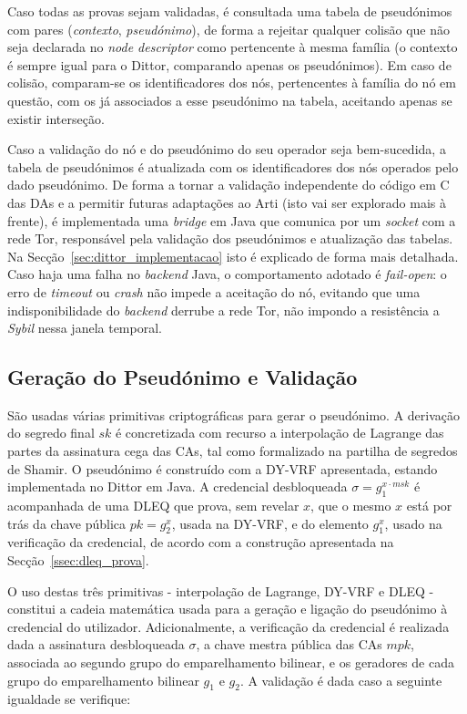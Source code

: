 Caso todas as provas sejam validadas, é consultada uma tabela de pseudónimos com pares (\textit{contexto}, \textit{pseudónimo}), de forma a rejeitar qualquer colisão que não seja declarada no \textit{node descriptor} como pertencente à mesma família (o contexto é sempre igual para o Dittor, comparando apenas os pseudónimos). Em caso de colisão, comparam-se os identificadores dos nós, pertencentes à família do nó em questão, com os já associados a esse pseudónimo na tabela, aceitando apenas se existir interseção.

Caso a validação do nó e do pseudónimo do seu operador seja bem-sucedida, a tabela de pseudónimos é atualizada com os identificadores dos nós operados pelo dado pseudónimo. De forma a tornar a validação independente do código em C das DAs e a permitir futuras adaptações ao Arti (isto vai ser explorado mais à frente), é implementada uma \textit{bridge} em Java que comunica por um \textit{socket} com a rede Tor, responsável pela validação dos pseudónimos e atualização das tabelas. Na Secção~\ref{sec:dittor_implementacao} isto é explicado de forma mais detalhada. Caso haja uma falha no \textit{backend} Java, o comportamento adotado é \textit{fail-open}: o erro de \textit{timeout} ou \textit{crash} não impede a aceitação do nó, evitando que uma indisponibilidade do \textit{backend} derrube a rede Tor, não impondo a resistência a \textit{Sybil} nessa janela temporal.

\subsection{Geração do Pseudónimo e Validação}
\label{sub:dittor_protocolo_geracao_pseudonimo}

São usadas várias primitivas criptográficas para gerar o pseudónimo. A derivação do segredo final $sk$ é concretizada com recurso a interpolação de Lagrange das partes da assinatura cega das CAs, tal como formalizado na partilha de segredos de Shamir. O pseudónimo é construído com a DY-VRF apresentada, estando implementada no Dittor em Java. A credencial desbloqueada $\sigma = g_1^{x \cdot msk}$ é acompanhada de uma DLEQ que prova, sem revelar $x$, que o mesmo $x$ está por trás da chave pública $pk = g_2^x$, usada na DY-VRF, e do elemento $g_1^x$, usado na verificação da credencial, de acordo com a construção apresentada na Secção~\ref{ssec:dleq_prova}.

O uso destas três primitivas - interpolação de Lagrange, DY-VRF e DLEQ - constitui a cadeia matemática usada para a geração e ligação do pseudónimo à credencial do utilizador. Adicionalmente, a verificação da credencial é realizada dada a assinatura desbloqueada $\sigma$, a chave mestra pública das CAs $mpk$, associada ao segundo grupo do emparelhamento bilinear, e os geradores de cada grupo do emparelhamento bilinear $g_1$ e $g_2$. A validação é dada caso a seguinte igualdade se verifique:

